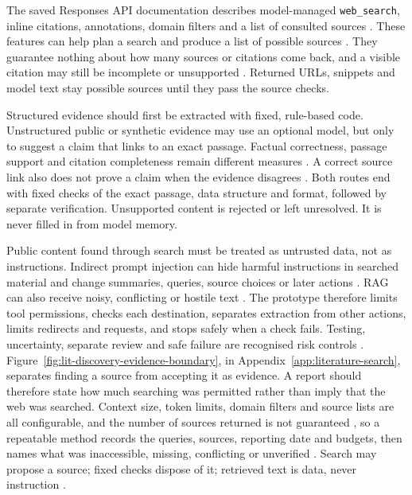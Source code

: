 The saved Responses API documentation describes model-managed \texttt{web\_search}, inline
citations, annotations, domain filters and a list of consulted sources
\citep{openai2026websearch}. These features can help plan a search and produce a list of possible
sources \citep{gao2023ragsurvey}. They guarantee nothing about how many sources or citations come
back, and a visible citation may still be incomplete or unsupported \citep{gao2023alce}. Returned
URLs, snippets and model text stay possible sources until they pass the source checks.

Structured evidence should first be extracted with fixed, rule-based code. Unstructured public or
synthetic evidence may use an optional model, but only to suggest a claim that links to an exact
passage. Factual correctness, passage support and citation completeness remain different measures
\citep{gao2023alce}. A correct source link also does not prove a claim when the evidence
disagrees \citep{gao2023rarr}. Both routes end with fixed checks of the exact passage, data
structure and format, followed by separate verification. Unsupported content is rejected or left
unresolved. It is never filled in from model memory.

Public content found through search must be treated as untrusted data, not as instructions.
Indirect prompt injection can hide harmful instructions in searched material and change
summaries, queries, source choices or later actions \citep{greshake2023indirect}. RAG can also
receive noisy, conflicting or hostile text \citep{gao2023ragsurvey}. The prototype therefore
limits tool permissions, checks each destination, separates extraction from other actions, limits
redirects and requests, and stops safely when a check fails. Testing, uncertainty, separate
review and safe failure are recognised risk controls \citep{nist2023airmf}.
Figure~\ref{fig:lit-discovery-evidence-boundary}, in Appendix~\ref{app:literature-search},
separates finding a source from accepting it as evidence. A report should therefore state how much searching was permitted rather than imply that the web
was searched. Context size, token limits, domain filters and source lists are all configurable,
and the number of sources returned is not guaranteed \citep{openai2026websearch}, so a
repeatable method records the queries, sources, reporting date and budgets, then names what was
inaccessible, missing, conflicting or unverified
\citep{pineau2021reproducibility,gao2023alce}. Search may propose a source; fixed checks dispose
of it; retrieved text is data, never instruction
\citep{greshake2023indirect,nist2023airmf}.

